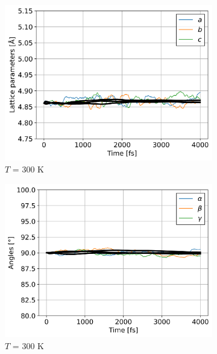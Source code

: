 \documentclass[preprint, 12pt]{elsarticle}
\newcommand{\?}{\stackrel{?}{=}}
\begin{document}
\begin{figure}[h!]
\centering
\begin{subfigure}{0.48\textwidth}
    \includegraphics[width=\textwidth]{LatConst-300.png}
    \caption{$T$ = 300 K}
    \label{Fig:LatConst-300}
\end{subfigure}
\hfill
\begin{subfigure}{0.48\textwidth}
    \includegraphics[width=\textwidth]{Angles-300.png}
    \caption{$T$ = 300 K}
    \label{Fig:Angles-300}
\end{subfigure}
\begin{subfigure}{0.48\textwidth}

\end{subfigure}
\end{figure}
\end{document}
